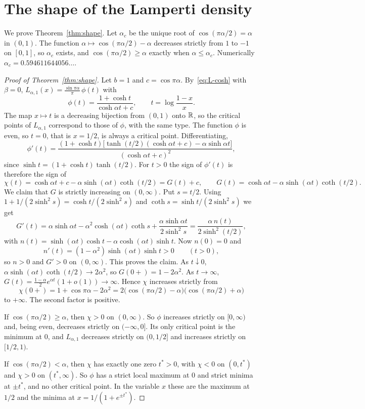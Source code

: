 \section{The shape of the Lamperti density}\label{sec:shape}

We prove Theorem~\ref{thm:shape}. Let $\alpha_c$ be the unique root of
$\cos(\pi\alpha/2)=\alpha$ in $(0,1)$. The function $\alpha\mapsto\cos(\pi\alpha/2)-\alpha$
decreases strictly from $1$ to $-1$ on $[0,1]$, so $\alpha_c$ exists, and
$\cos(\pi\alpha/2)\ge\alpha$ exactly when $\alpha\le\alpha_c$. Numerically
$\alpha_c=0.594611644056\ldots$.

\begin{proof}[Proof of Theorem~\ref{thm:shape}]
Let $b=1$ and $c=\cos\pi\alpha$. By~\eqref{eq:L-cosh} with $\beta=0$,
$L_{\alpha,1}(x)=\frac{\sin\pi\alpha}\pi\,\phi(t)$ with
\[
 \phi(t)=\frac{1+\cosh t}{\cosh\alpha t+c},\qquad t=\log\frac{1-x}x .
\]
The map $x\mapsto t$ is a decreasing bijection from $(0,1)$ onto $\mathbb{R}$, so the critical
points of $L_{\alpha,1}$ correspond to those of $\phi$, with the same type. The function
$\phi$ is even, so $t=0$, that is $x=1/2$, is always a critical point. Differentiating,
\[
 \phi'(t)=\frac{(1+\cosh t)\bigl[\tanh(t/2)(\cosh\alpha t+c)-\alpha\sinh\alpha t\bigr]}{(\cosh\alpha t+c)^2},
\]
since $\sinh t=(1+\cosh t)\tanh(t/2)$. For $t>0$ the sign of $\phi'(t)$ is therefore the
sign of
\[
 \chi(t)=\cosh\alpha t+c-\alpha\sinh(\alpha t)\coth(t/2)=G(t)+c,\qquad
 G(t)=\cosh\alpha t-\alpha\sinh(\alpha t)\coth(t/2).
\]
We claim that $G$ is strictly increasing on $(0,\infty)$. Put $s=t/2$. Using
$1+1/(2\sinh^2s)=\cosh t/(2\sinh^2s)$ and $\coth s=\sinh t/(2\sinh^2s)$ we get
\[
 G'(t)=\alpha\sinh\alpha t-\alpha^2\cosh(\alpha t)\coth s+\frac{\alpha\sinh\alpha t}{2\sinh^2s}
 =\frac{\alpha\,n(t)}{2\sinh^2(t/2)},
\]
with $n(t)=\sinh(\alpha t)\cosh t-\alpha\cosh(\alpha t)\sinh t$. Now $n(0)=0$ and
\[
 n'(t)=(1-\alpha^2)\sinh(\alpha t)\sinh t>0\qquad(t>0),
\]
so $n>0$ and $G'>0$ on $(0,\infty)$. This proves the claim. As $t\downarrow0$,
$\alpha\sinh(\alpha t)\coth(t/2)\to2\alpha^2$, so $G(0+)=1-2\alpha^2$. As $t\to\infty$,
$G(t)=\frac{1-\alpha}2e^{\alpha t}(1+o(1))\to\infty$. Hence $\chi$ increases strictly
from
\[
 \chi(0+)=1+\cos\pi\alpha-2\alpha^2=2\bigl(\cos(\pi\alpha/2)-\alpha\bigr)\bigl(\cos(\pi\alpha/2)+\alpha\bigr)
\]
to $+\infty$. The second factor is positive.

If $\cos(\pi\alpha/2)\ge\alpha$, then $\chi>0$ on $(0,\infty)$. So $\phi$ increases strictly
on $[0,\infty)$ and, being even, decreases strictly on $(-\infty,0]$. Its only critical
point is the minimum at $0$, and $L_{\alpha,1}$ decreases strictly on $(0,1/2]$ and
increases strictly on $[1/2,1)$.

If $\cos(\pi\alpha/2)<\alpha$, then $\chi$ has exactly one zero $t^*>0$, with $\chi<0$
on $(0,t^*)$ and $\chi>0$ on $(t^*,\infty)$. So $\phi$ has a strict local maximum at
$0$ and strict minima at $\pm t^*$, and no other critical point. In the variable $x$
these are the maximum at $1/2$ and the minima at $x=1/(1+e^{\pm t^*})$.
\end{proof}

